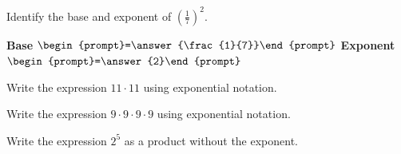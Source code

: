 \documentclass{ximera}
\begin{document}
\begin{problem} Identify the base and exponent of $\displaystyle \left(\frac{1}{7} \right)^2.$


\hspace{2in} \textbf{Base} $\begin{prompt}=\answer{\frac{1}{7}}\end{prompt}$  \hspace{1in}  \textbf{Exponent} $\begin{prompt}=\answer{2}\end{prompt}$

\end{problem}


\begin{problem} Write the expression $11 \cdot 11 $ using exponential notation.


\begin{multipleChoice}
  \end{multipleChoice}

\end{problem}


\begin{problem} Write the expression $9 \cdot 9 \cdot 9 \cdot 9$ using exponential notation.


\begin{multipleChoice}
  \end{multipleChoice}

\end{problem}


\begin{problem} Write the expression $2^5$ as a product without the exponent.


\begin{multipleChoice}
  \end{multipleChoice}

\end{problem}
\end{document}
